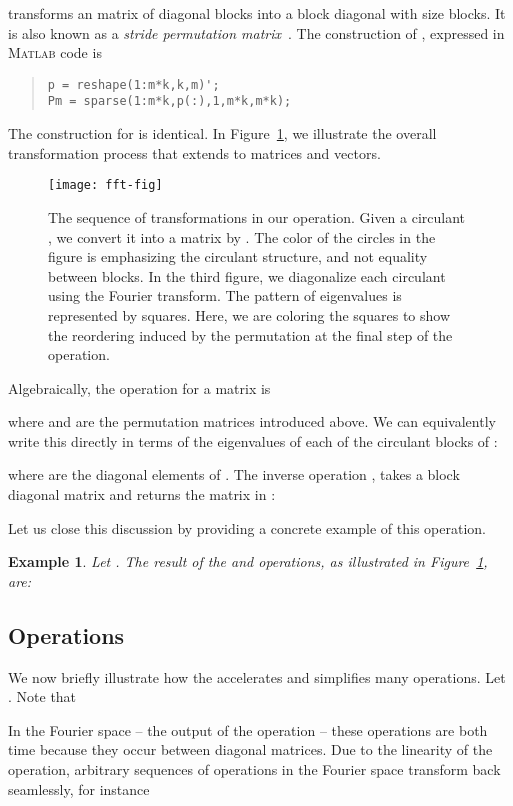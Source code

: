 \documentclass[1p,authoryear,letterpaper]{elsarticle}
\renewcommand{\cite}{\citep}
\newtheorem{example}[theorem]{Example}
\begin{document}
transforms an  matrix of 
diagonal blocks into a block diagonal  with  size
blocks.
It is also known as a
\emph{stride permutation matrix}~\cite{Granata1992-tensor}.
The construction of , expressed in \textsc{Matlab} code is
\begin{quote}
\begin{verbatim}
p = reshape(1:m*k,k,m)';
Pm = sparse(1:m*k,p(:),1,m*k,m*k);
\end{verbatim}
\end{quote}
The construction for  is identical.
In Figure~\ref{fig:circ-fft}, we illustrate the overall
transformation process that extends  to matrices
and vectors.
\begin{figure}
\centering
\texttt{[image: fft-fig]}

\caption{The sequence of transformations in our  operation.
Given a circulant , we convert it into a matrix by .
The color of the circles in the figure is emphasizing the circulant
structure, and not equality between blocks.  In the third
figure, we diagonalize each
circulant using the Fourier transform.  The pattern of
eigenvalues is represented by squares.  Here, we are coloring
the squares to show the reordering induced by the permutation
at the final step of the  operation.}
\label{fig:circ-fft}
\end{figure}

Algebraically, the  operation for a matrix  is

where  and  are the permutation matrices introduced
above.
We can equivalently write this directly in terms of the
eigenvalues of each of the circulant blocks of :

where  are the diagonal
elements of .
The inverse operation , takes a block diagonal matrix and returns
the matrix in :


Let us close this discussion by providing a concrete example of this operation.
\begin{example} \label{ex:cft}
Let  .
The result of the  and  operations, as illustrated in Figure~\ref{fig:circ-fft}, are:

\end{example}


\subsection{Operations}
We now briefly illustrate how the  accelerates
and simplifies many operations.  Let .
Note that

In the Fourier space -- the output of the  operation --
these operations are both  time because they occur between diagonal
matrices.
Due to the linearity of the  operation, arbitrary sequences of
operations in the Fourier space
transform back seamlessly, for instance
\end{document}
